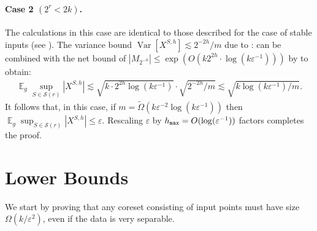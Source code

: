 \documentclass[11pt]{article}
\theoremstyle{restate}
\theoremstyle{definition}
\newcommand{\eps}{\ensuremath{\varepsilon}}
\DeclareMathOperator*{\var}{\mathrm{Var}}
\newcommand{\E}{\mathop{\mathbb{E}}}
\newcommand{\hmax}{h_\ensuremath{\textnormal{\texttt{max}}}}
\begin{document}
\paragraph{Case 2 $(2^r < 2k)$.} The calculations in this case are identical to those described for the case of stable inputs (see ). 
The variance bound $\var[X^{S,h}] \lesssim 2^{-2h}/m$ 
 due to : can be combined with the net bound of  $ |M_{2^{-h}}|  \leq \exp(O(k2^{2h} \cdot \log(k \eps^{-1})))$ 
 by  to obtain: 
\begin{align*}
\E_g \sup_{S \in \mathcal{S}(r)} |X^{S,h}|\lesssim \sqrt{k \cdot 2^{2h} \log(k \eps^{-1})} \cdot \sqrt{2^{-2h}/m}   \lesssim \sqrt{k \log(k \eps^{-1})/m}.
\end{align*}
It follows that, in this case, if $m = \tilde{\Omega}(k \eps^{-2} \log(k \eps^{-1}))$ then $\E_g \sup_{S \in \mathcal{S}(r)} |X^{S,h}| \leq \eps$.  Rescaling $\eps$ by ${\hmax = O(\log(\eps^{-1}))}$ factors completes the proof.







\section{Lower Bounds}
\label{sec:lowerbound}

We start by proving that any coreset consisting of input points must have size $\Omega(k/\varepsilon^2)$, even if the data is very separable.
\end{document}

